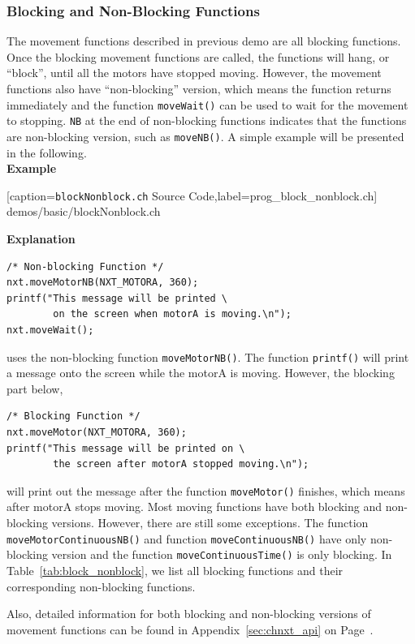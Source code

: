 \documentclass[11pt]{article}
\begin{document}
\subsubsection{\label{sec:block_nonblock}Blocking and Non-Blocking Functions}
The movement functions described in previous demo are all blocking functions. 
Once the blocking movement functions are called, the functions will hang, or 
``block'', until all the motors have stopped moving. However, the movement 
functions also have ``non-blocking'' version, which means the function returns 
immediately and the function {\tt moveWait()} can be used to wait for the 
movement to stopping. {\tt NB} at the end of non-blocking functions indicates 
that the functions are non-blocking version, such as {\tt moveNB()}. A simple 
example will be presented in the following.\\

\noindent
{\bf Example}

[caption={{\tt blockNonblock.ch} Source Code},label=prog_block_nonblock.ch]
{demos/basic/blockNonblock.ch}

\noindent
\textbf{Explanation}\\

\begin{lstlisting}
/* Non-blocking Function */
nxt.moveMotorNB(NXT_MOTORA, 360);
printf("This message will be printed \
        on the screen when motorA is moving.\n");
nxt.moveWait();
\end{lstlisting}
uses the non-blocking function {\tt moveMotorNB()}. The function {\tt printf()} 
will print a message onto the screen while the motorA is moving. However, the 
blocking part below,
\begin{lstlisting}
/* Blocking Function */
nxt.moveMotor(NXT_MOTORA, 360);
printf("This message will be printed on \
        the screen after motorA stopped moving.\n");
\end{lstlisting}
will print out the message after the function {\tt moveMotor()} finishes, which 
means after motorA stops moving. Most moving functions have both blocking and 
non-blocking versions. However, there are still some exceptions. The function 
{\tt moveMotorContinuousNB()} and function {\tt moveContinuousNB()} have only 
non-blocking version and the function {\tt moveContinuousTime()} is only blocking. 
In Table~\ref{tab:block_nonblock}, we list all blocking functions and their 
corresponding non-blocking functions.

Also, detailed information for both blocking and non-blocking versions of movement 
functions can be found in Appendix~\ref{sec:chnxt_api} on Page~\pageref{sec:chnxt_api}.
\end{document}
